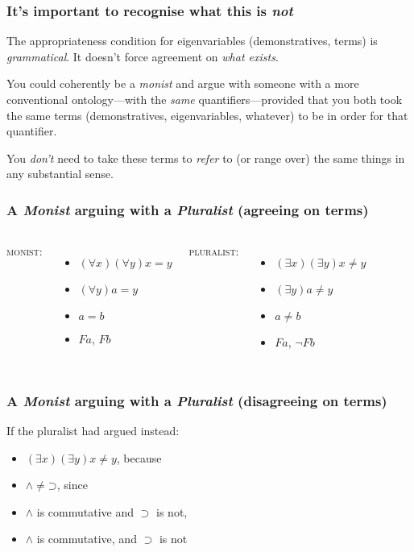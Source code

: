 \documentclass{beamer} %
\def\hk{\supset}
\begin{document}
\begin{frame}\frametitle{It's important to recognise what this is \emph{not}}
The appropriateness condition for eigenvariables (demonstratives, terms) is \emph{grammatical}. It doesn't force agreement on \emph{what exists}. \\[6mm]\pause

You could coherently be a \emph{monist} and argue with someone with a more conventional ontology---with the \emph{same} quantifiers---provided that you both took the same terms (demonstratives, eigenvariables, whatever) to be in order for that quantifier.\\[6mm] \pause

You \emph{don't} need to take these terms to \emph{refer} to (or range over) the same things in any substantial sense.
\end{frame}

\begin{frame}\frametitle{A \emph{Monist} arguing with a \emph{Pluralist} (agreeing on terms)}
\begin{columns}
\column{5cm}
\textsc{monist:}
\begin{itemize}
\item<1-> $(\forall x)(\forall y)x=y$
\item<4-> $(\forall y)a=y$
\item<6-> $a=b$
\item<8-> $Fa$, \alert<9->{$Fb$}
\end{itemize}
\column{5cm}
\textsc{pluralist:}
\begin{itemize}
\item<2-> $(\exists x)(\exists y)x\neq y$
\item<3-> $(\exists y)a\neq y$
\item<5-> $a\neq b$
\item<7-> $Fa$, \alert<9->{$\neg Fb$}
\end{itemize}
\end{columns}
\end{frame}
\def\Zero{\bot}\def\One{\top}
\begin{frame}\frametitle{A \emph{Monist} arguing with a \emph{Pluralist} (disagreeing on terms)}
If the pluralist had argued instead: 
\begin{itemize}
\item $(\exists x)(\exists y)x\neq y$, because
\item<2-> $\mathord{\land}\neq\mathord{\hk}$, since
\item<3->  $\land$ is commutative and $\hk$ is not,
\end{itemize}
\medskip
{}
\begin{itemize}
\item<5-> $\land$ is commutative, and $\hk$ is not
\end{itemize}
\medskip
{}
\end{frame}
\end{document}
